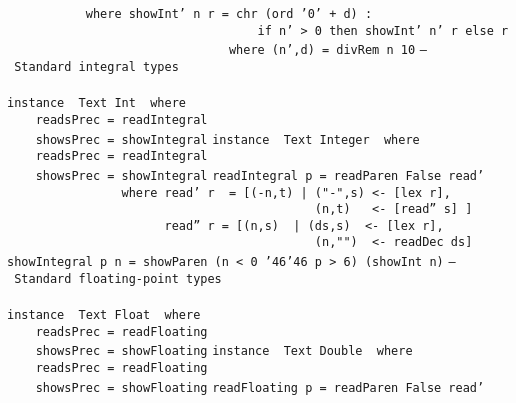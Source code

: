 \mbox{\tt \ \ \ \ \ \ \ \ \ \ \ where\ showInt'\ n\ r\ =\ chr\ (ord\ '0'\ +\ d)\ :}\\
\mbox{\tt \ \ \ \ \ \ \ \ \ \ \ \ \ \ \ \ \ \ \ \ \ \ \ \ \ \ \ \ \ \ \ \ \ \ \ if\ n'\ >\ 0\ then\ showInt'\ n'\ r\ else\ r}\\
\mbox{\tt \ \ \ \ \ \ \ \ \ \ \ \ \ \ \ \ \ \ \ \ \ \ \ \ \ \ \ \ \ \ \ where\ (n',d)\ =\ divRem\ n\ 10}
%
\eprogB\noindent\bprogB
\mbox{\tt --\ Standard\ integral\ types}\\
\mbox{\tt }\\
\mbox{\tt instance\ \ Text\ Int\ \ where}\\
\mbox{\tt \ \ \ \ readsPrec\ =\ readIntegral}\\
\mbox{\tt \ \ \ \ showsPrec\ =\ showIntegral}
\eprogB\noindent\bprogB
\mbox{\tt instance\ \ Text\ Integer\ \ where}\\
\mbox{\tt \ \ \ \ readsPrec\ =\ readIntegral}\\
\mbox{\tt \ \ \ \ showsPrec\ =\ showIntegral}
\eprogB\noindent\bprogB
\mbox{\tt readIntegral\ p\ =\ readParen\ False\ read'}\\
\mbox{\tt \ \ \ \ \ \ \ \ \ \ \ \ \ \ \ \ where\ read'\ r\ \ =\ [(-n,t)\ |\ ("-",s)\ <-\ [lex\ r],}\\
\mbox{\tt \ \ \ \ \ \ \ \ \ \ \ \ \ \ \ \ \ \ \ \ \ \ \ \ \ \ \ \ \ \ \ \ \ \ \ \ \ \ \ \ \ \ \ (n,t)\ \ \ <-\ [read''\ s]\ ]}\\
\mbox{\tt \ \ \ \ \ \ \ \ \ \ \ \ \ \ \ \ \ \ \ \ \ \ read''\ r\ =\ [(n,s)\ \ |\ (ds,s)\ \ <-\ [lex\ r],}\\
\mbox{\tt \ \ \ \ \ \ \ \ \ \ \ \ \ \ \ \ \ \ \ \ \ \ \ \ \ \ \ \ \ \ \ \ \ \ \ \ \ \ \ \ \ \ \ (n,"")\ \ <-\ readDec\ ds]}
\eprogB\noindent\bprogB
\mbox{\tt showIntegral\ p\ n\ =\ showParen\ (n\ <\ 0\ {\char'46}{\char'46}\ p\ >\ 6)\ (showInt\ n)}
\eprogB\noindent\bprogB
\mbox{\tt --\ Standard\ floating-point\ types}\\
\mbox{\tt }\\
\mbox{\tt instance\ \ Text\ Float\ \ where}\\
\mbox{\tt \ \ \ \ readsPrec\ =\ readFloating}\\
\mbox{\tt \ \ \ \ showsPrec\ =\ showFloating}
\eprogB\noindent\bprogB
\mbox{\tt instance\ \ Text\ Double\ \ where}\\
\mbox{\tt \ \ \ \ readsPrec\ =\ readFloating}\\
\mbox{\tt \ \ \ \ showsPrec\ =\ showFloating}
\eprogB\noindent\bprogB
\mbox{\tt readFloating\ p\ =\ readParen\ False\ read'}\\

